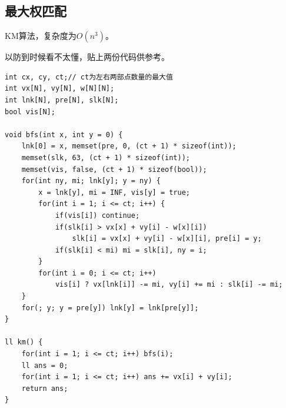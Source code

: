 \documentclass[a4paper,11pt,twoside,fontset = fandol,UTF8]{ctexbook} %
\begin{document}
	\subsection{最大权匹配}
	KM算法，复杂度为$O(n^3)$。
	
	以防到时候看不太懂，贴上两份代码供参考。
	\begin{lstlisting}
int cx, cy, ct;// ct为左右两部点数量的最大值
int vx[N], vy[N], w[N][N];
int lnk[N], pre[N], slk[N];
bool vis[N];

void bfs(int x, int y = 0) {
    lnk[0] = x, memset(pre, 0, (ct + 1) * sizeof(int));
    memset(slk, 63, (ct + 1) * sizeof(int));
    memset(vis, false, (ct + 1) * sizeof(bool));
    for(int ny, mi; lnk[y]; y = ny) {
        x = lnk[y], mi = INF, vis[y] = true;
        for(int i = 1; i <= ct; i++) {
            if(vis[i]) continue;
            if(slk[i] > vx[x] + vy[i] - w[x][i])
                slk[i] = vx[x] + vy[i] - w[x][i], pre[i] = y;
            if(slk[i] < mi) mi = slk[i], ny = i;
        }
        for(int i = 0; i <= ct; i++)
            vis[i] ? vx[lnk[i]] -= mi, vy[i] += mi : slk[i] -= mi;
    }
    for(; y; y = pre[y]) lnk[y] = lnk[pre[y]];
}

ll km() {
    for(int i = 1; i <= ct; i++) bfs(i);
    ll ans = 0;
    for(int i = 1; i <= ct; i++) ans += vx[i] + vy[i];
    return ans;
}

	\end{lstlisting}
	
\end{document}

